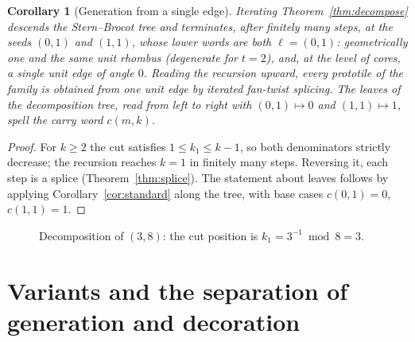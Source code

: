 \documentclass[11pt]{article}
\newtheorem{corollary}[theorem]{Corollary}
\theoremstyle{remark}
\theoremstyle{definition}
\begin{document}
\begin{corollary}[Generation from a single edge]\label{cor:generation}
Iterating Theorem~\ref{thm:decompose} descends the Stern--Brocot tree and terminates,
after finitely many steps, at the seeds $(0,1)$ and $(1,1)$, whose lower words are both
$\ell=(0,1)$: geometrically one and the same unit rhombus (degenerate for $t=2$), and,
at the level of cores, a single unit edge of angle $0$. Reading the recursion upward,
every prototile of the family is obtained from one unit edge by iterated fan-twist
splicing. The leaves of the decomposition tree, read from left to right with
$(0,1)\mapsto 0$ and $(1,1)\mapsto 1$, spell the carry word $c(m,k)$.
\end{corollary}

\begin{proof}
For $k\ge2$ the cut satisfies $1\le k_1\le k-1$, so both denominators strictly decrease;
the recursion reaches $k=1$ in finitely many steps. Reversing it, each step is a splice
(Theorem~\ref{thm:splice}). The statement about leaves follows by applying
Corollary~\ref{cor:standard} along the tree, with base cases $c(0,1)=0$, $c(1,1)=1$.
\end{proof}

\begin{figure}[t]
\centering
{}

\caption{Decomposition of $(3,8)$: the cut position is $k_1=3^{-1}\bmod 8=3$.}
\label{fig:cut}
\end{figure}

\section{Variants and the separation of generation and decoration}\label{sec:variants}
\end{document}
